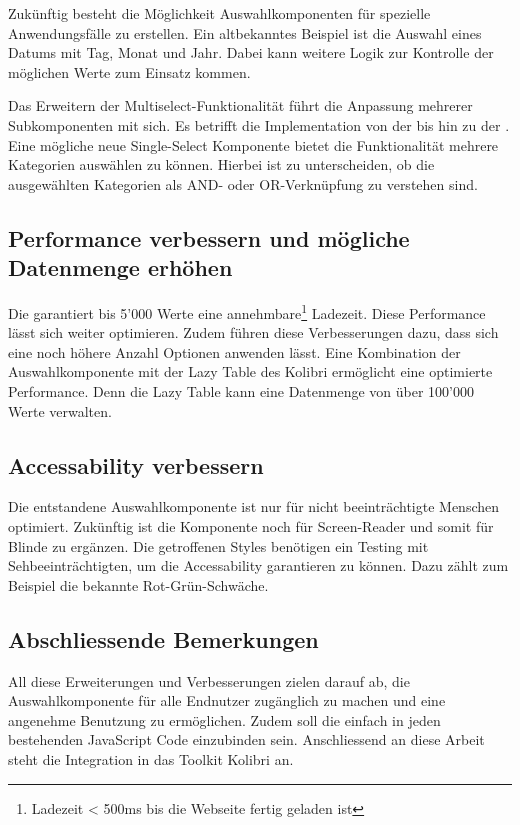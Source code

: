 Zukünftig besteht die Möglichkeit Auswahlkomponenten für spezielle Anwendungsfälle zu erstellen. 
Ein altbekanntes Beispiel ist die Auswahl eines Datums mit Tag, Monat und Jahr. 
Dabei kann weitere Logik zur Kontrolle der möglichen Werte zum Einsatz kommen. 

Das Erweitern der Multiselect-Funktionalität führt die Anpassung mehrerer Subkomponenten mit sich. 
Es betrifft die Implementation von der  bis hin zu der . 
Eine mögliche neue Single-Select Komponente bietet die Funktionalität mehrere Kategorien auswählen zu können. 
Hierbei ist zu unterscheiden, ob die ausgewählten Kategorien als AND- oder OR-Verknüpfung zu verstehen sind. 


\subsection{Performance verbessern und mögliche Datenmenge erhöhen}
\label{sec:betterPerformance}

Die  garantiert bis 5'000 Werte eine annehmbare\footnote{
    Ladezeit < 500ms bis die Webseite fertig geladen ist
} Ladezeit. 
Diese Performance lässt sich weiter optimieren. 
Zudem führen diese Verbesserungen dazu, dass sich eine noch höhere Anzahl Optionen anwenden lässt. 
Eine Kombination der Auswahlkomponente mit der Lazy Table des Kolibri ermöglicht eine optimierte Performance. 
Denn die Lazy Table kann eine Datenmenge von über 100'000 Werte verwalten. 


\subsection{Accessability verbessern}
\label{sec:betterAccessability}

Die entstandene Auswahlkomponente ist nur für nicht beeinträchtigte Menschen optimiert. 
Zukünftig ist die Komponente noch für Screen-Reader und somit für Blinde zu ergänzen. 
Die getroffenen Styles benötigen ein Testing mit Sehbeeinträchtigten, um die Accessability garantieren zu können. 
Dazu zählt zum Beispiel die bekannte Rot-Grün-Schwäche. 


\subsection{Abschliessende Bemerkungen}
\label{sec:endSumup}

All diese Erweiterungen und Verbesserungen zielen darauf ab, die Auswahlkomponente für alle Endnutzer zugänglich zu machen und eine angenehme Benutzung zu ermöglichen. 
Zudem soll die  einfach in jeden bestehenden JavaScript Code einzubinden sein. 
Anschliessend an diese Arbeit steht die Integration in das Toolkit Kolibri an. 
